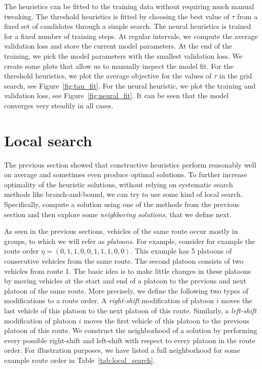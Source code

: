 \documentclass[a4paper]{article}
\theoremstyle{definition}
\theoremstyle{plain}
\begin{document}
The heuristics can be fitted to the training data without requiring much manual tweaking.
%
The threshold heuristics is fitted by choosing the best value of $\tau$ from a fixed set of candidates through a simple search.
The neural heuristics is trained for a fixed number of training steps. At regular intervals, we compute the average validation loss and store the current model parameters. At the end of the training, we pick the model parameters with the smallest validation loss.
%
We create some plots that allow us to manually inspect the model fit.
For the threshold heuristics, we plot the average objective for the values of
$\tau$ in the grid search, see Figure~\ref{fig:tau_fit}.
%
For the neural heuristic, we plot the training and validation loss, see
Figure~\ref{fig:neural_fit}. It can be seen that the model converges very steadily in all cases.



\section{Local search}

The previous section showed that constructive heuristics perform reasonably well
on average and sometimes even produce optimal solutions. To further increase
optimality of the heuristic solutions, without relying on systematic search
methods like branch-and-bound, we can try to use some kind of local search.
Specifically, compute a solution using one of the methods from the previous
section and then explore some \textit{neighboring solutions}, that we define next.

As seen in the previous sections, vehicles of the same route occur mostly in
groups, to which we will refer as \textit{platoons}. For example, consider for example
the route order $\eta = (0, 1, 1, 0, 0, 1, 1, 1, 0, 0)$. This example has 5
platoons of consecutive vehicles from the same route. The second platoon
consists of two vehicles from route 1.
The basic idea is to make little changes in these platoons by moving vehicles at
the start and end of a platoon to the previous and next platoon of the same
route.
%
More precisely, we define the following two types of modifications to a route
order. A \textit{right-shift} modification of platoon $i$ moves the last vehicle of this
platoon to the next platoon of this route. Similarly, a \textit{left-shift} modification
of platoon $i$ moves the first vehicle of this platoon to the previous platoon
of this route.
%
We construct the neighborhood of a solution by performing every possible
right-shift and left-shift with respect to every platoon in the route order. For
illustration purposes, we have listed a full neighborhood for some example route
order in Table~\ref{tab:local_search}.
\end{document}
